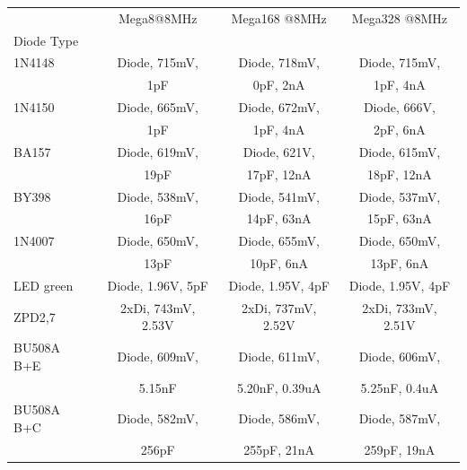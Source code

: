 \begin{table}[H]
  \begin{center}
    \begin{tabular}{| l | c | c | c |}
    \hline
           & Mega8@8MHz & Mega168 @8MHz & Mega328 @8MHz \\
 Diode Type  &                  &                  &                  \\
    \hline
    \hline
1N4148     & Diode, 715mV,        & Diode, 718mV,            & Diode, 715mV,           \\
           &               1pF    &               0pF, 2nA   &               1pF, 4nA  \\
    \hline
1N4150     & Diode, 665mV,        & Diode, 672mV,            & Diode, 666V,           \\
           &               1pF    &               1pF, 4nA   &              2pF, 6nA  \\
    \hline
BA157      & Diode, 619mV,        & Diode, 621V,              & Diode, 615mV,            \\
           &               19pF   &              17pF, 12nA   &               18pF, 12nA \\
    \hline
BY398      & Diode, 538mV,        & Diode, 541mV,             & Diode, 537mV,            \\
           &               16pF   &               14pF, 63nA  &               15pF, 63nA \\
    \hline
1N4007     & Diode, 650mV,        & Diode, 655mV,            & Diode, 650mV,           \\
           &               13pF   &               10pF, 6nA  &               13pF, 6nA \\
    \hline
LED green  & Diode, 1.96V, 5pF    & Diode, 1.95V, 4pF   & Diode, 1.95V, 4pF \\
    \hline
ZPD2,7     & 2xDi, 743mV, 2.53V   & 2xDi, 737mV, 2.52V  & 2xDi, 733mV, 2.51V \\
    \hline
BU508A B+E & Diode, 609mV,        & Diode, 611mV,                & Diode, 606mV,              \\
           &               5.15nF &               5.20nF, 0.39uA &               5.25nF, 0.4uA\\
    \hline
BU508A B+C & Diode, 582mV,        & Diode, 586mV,             & Diode, 587mV,            \\
           &               256pF  &               255pF, 21nA &               259pF, 19nA\\

\end{tabular}
\end{center}
\end{table}
